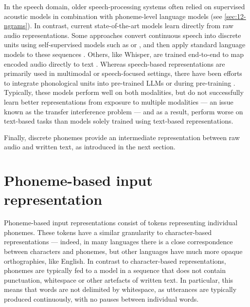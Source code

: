 In the speech domain, older speech-processing systems often relied on supervised acoustic models in combination with phoneme-level language models (see \cref{sec:12-ngrams}). In contrast, current state-of-the-art models learn directly from raw audio representations. Some approaches convert continuous speech into discrete units using self-supervised models such as  \citep{baevski2020wav2vec} or  \citep{hsu-2021-hubert}, and then apply standard language models to these sequences \citep{lakhotia2021generative}. Others, like Whisper, are trained end-to-end to map encoded audio directly to text \citep{radford2023robust}. Whereas speech-based representations are primarily used in multimodal or speech-focused settings, there have been efforts to integrate phonological units into pre-trained LLMs \citep{nguyen-etal-2025-spirit} or during pre-training \citep{bapna2021slam}. Typically, these models perform well on both modalities, but do not successfully learn better representations from exposure to multiple modalities --- an issue known as the transfer interference problem \citep{arivazhagan2019massively} --- and as a result, perform worse on text-based tasks than models solely trained using text-based representations. 

Finally, discrete phonemes provide an intermediate representation between raw audio and written text, as introduced in the next section. %


\section{Phoneme-based input representation}\label{sec:12-phonemic}

Phoneme-based input representations consist of tokens representing individual phonemes. These tokens have a similar granularity to character-based representations --- indeed, in many languages there is a close correspondence between characters and phonemes, but other languages have much more opaque orthographies, like English. In contrast to character-based representations, phonemes are typically fed to a model in a sequence that does not contain punctuation, whitespace or other artefacts of written text. In particular, this means that words are not delimited by whitespace, as utterances are typically produced continuously, with no pauses between individual words.

